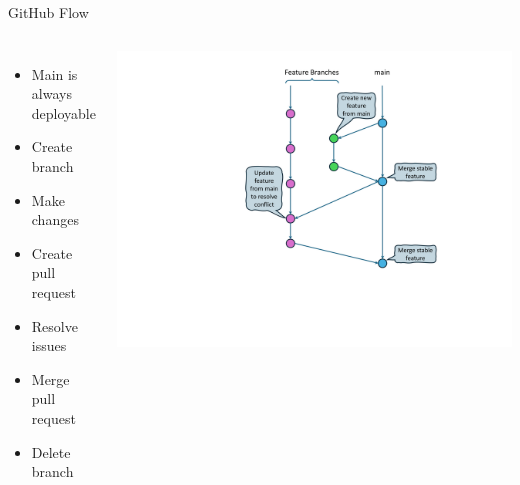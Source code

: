 \documentclass{slide}
\begin{document}
\begin{frame}{GitHub Flow \cite{github-flow}}
    \vspace{1pt}
    \begin{columns}
      {\LARGE
        \vspace{-2.5em}
        \begin{itemize}
            \item { Main is always deployable\\}
            \vspace{0.15em}
            \item Create branch
            \vspace{0.15em}
            \item Make changes
            \vspace{0.15em}
            \item Create pull request
            \vspace{0.15em}
            \item Resolve issues
            \vspace{0.15em}
            \item Merge pull request
            \vspace{0.15em}
            \item Delete branch
        \end{itemize}
      }
        \centering
        \includegraphics[trim=232 100 125 33,clip,height=\textheight]{diagrams/branching-diagrams/github-flow}
    \end{columns}
\end{frame}
\end{document}
